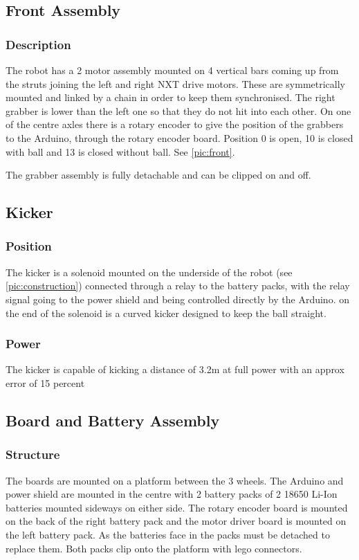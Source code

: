 \subsection{Front Assembly}
\subsubsection{Description}
The robot has a 2 motor assembly mounted on 4 vertical bars coming up from the struts joining the left and right NXT drive motors. These are symmetrically mounted and linked by a chain in order to keep them synchronised. The right grabber is lower than the left one so that they do not hit into each other. On one of the centre axles there is a rotary encoder to give the position of the grabbers to the Arduino, through the rotary encoder board. Position 0 is open, 10 is closed with ball and 13 is closed without ball. See \autoref{pic:front}.

The grabber assembly is fully detachable and can be clipped on and off. 


\subsection{Kicker}
\subsubsection{Position}
The kicker is a solenoid mounted on the underside of the robot (see \autoref{pic:construction}) connected through a relay to the battery packs, with the relay signal going to the power shield and being controlled directly by the Arduino. on the end of the solenoid is a curved kicker designed to keep the ball straight.

\subsubsection{Power}
The kicker is capable of kicking a distance of 3.2m at full power with an approx error of 15 percent

\subsection{Board and Battery Assembly}
\subsubsection{Structure}
The boards are mounted on a platform between the 3 wheels. The Arduino and power
shield are mounted in the centre with 2 battery packs of 2 18650 Li-Ion batteries mounted sideways on either
side. The rotary encoder board is
mounted on the back of the right battery pack and the motor driver board is mounted
on the left battery pack. As the batteries face in the packs must be detached to
replace them. Both packs clip onto the platform with lego connectors.

